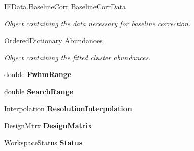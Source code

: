 \begin{DoxyCompactItemize}
\hyperlink{class_isotope_fit_1_1_i_f_data_1_1_baseline_corr}{I\+F\+Data.\+Baseline\+Corr} \hyperlink{class_isotope_fit_1_1_workspace_a700395fbb329b1a0fcb5932095db066f}{Baseline\+Corr\+Data}
\begin{DoxyCompactList}\small\item\em Object containing the data necessary for baseline correction. \end{DoxyCompactList}\item 
Ordered\+Dictionary \hyperlink{class_isotope_fit_1_1_workspace_a0ddbe91c8ebc52ce13212b3fe8a52408}{Abundances}
\begin{DoxyCompactList}\small\item\em Object containing the fitted cluster abundances. \end{DoxyCompactList}\item 
\mbox{\label{class_isotope_fit_1_1_workspace_ae9ea2482ae9119a46e4c556a81822b0b}} 
double {\bfseries Fwhm\+Range}
\item 
\mbox{\label{class_isotope_fit_1_1_workspace_afa36b8e6bf08258a63fde9193a99f473}} 
double {\bfseries Search\+Range}
\item 
\mbox{\label{class_isotope_fit_1_1_workspace_ace61bbc7eb1b0fd1c307864e34793ff2}} 
\hyperlink{class_isotope_fit_1_1_interpolation}{Interpolation} {\bfseries Resolution\+Interpolation}
\item 
\mbox{\label{class_isotope_fit_1_1_workspace_ae24a2ee8f965fb2ed7ad3a592163271d}} 
\hyperlink{class_isotope_fit_1_1_workspace_1_1_design_mtrx}{Design\+Mtrx} {\bfseries Design\+Matrix}
\item 
\mbox{\label{class_isotope_fit_1_1_workspace_aef3ecfbff23e4dbd7eb37c94e2cd32c9}} 
\hyperlink{class_isotope_fit_1_1_workspace_1_1_workspace_status}{Workspace\+Status} {\bfseries Status}
\end{DoxyCompactItemize}


